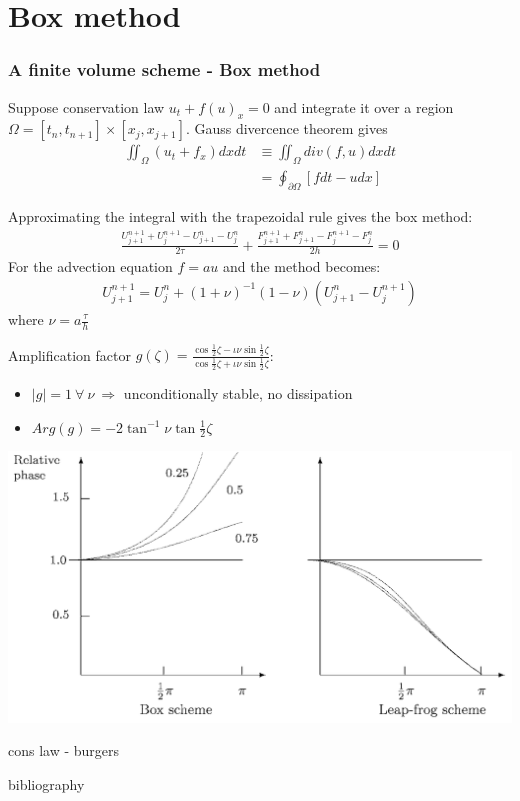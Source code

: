 \documentclass{beamer}
\begin{document}
\section{Box method}
\begin{frame}
\frametitle{A finite volume scheme - Box method}
Suppose conservation law $u_t + f(u)_x = 0$ and integrate it over a region $\Omega = [t_n,t_{n+1}] \times [x_j,x_{j+1}]$. Gauss divercence theorem gives
\begin{align*}
\iint_\Omega(u_t + f_x)dxdt & \equiv \iint_\Omega div(f,u)dxdt \\
& = \oint_{\partial\Omega}[fdt-udx]
\end{align*}
\end{frame}
\begin{frame}
Approximating the integral with the trapezoidal rule gives the box method:
\begin{align*}
\frac{U_{j+1}^{n+1} + U_j^{n+1} - U_{j + 1}^n - U_j^n}{2\tau} + \frac{F_{j+1}^{n+1} + F_{j+1}^n - F_j^{n+1} - F_j^n}{2h} = 0
\end{align*}
For the advection equation $f = au$ and the method becomes:
\begin{align*}
U_{j+1}^{n+1} = U_j^n + (1 + \nu)^{-1}(1 - \nu)(U_{j+1}^n - U_j^{n+1})
\end{align*}
where  $\nu =  a\frac{\tau}{h}$
\end{frame}
\begin{frame}
Amplification factor $g(\zeta) = \displaystyle{\frac{\cos{\frac{1}{2}\zeta} - \iota\nu\sin{\frac{1}{2}\zeta}}{\cos{\frac{1}{2}\zeta} + \iota\nu\sin{\frac{1}{2}\zeta}}}$:
\begin{itemize}
\setlength\itemsep{1em}
\item $|g| = 1 \ \forall \ \nu \ \Rightarrow$ unconditionally stable, no dissipation
\item $Arg(g) = -2\tan^{-1}{\nu\tan{\frac{1}{2}\zeta}}$
\end{itemize}
\end{frame}
\begin{frame}
\includegraphics[width=\textwidth]{lp_bx_lag}
\end{frame}
\begin{frame}
cons law - burgers
\end{frame}
\begin{frame}
bibliography
\end{frame}
\end{document}
